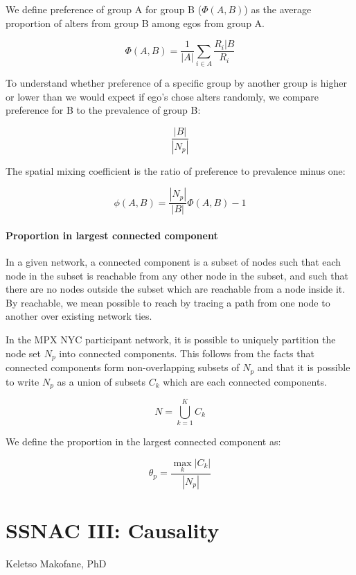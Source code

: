 \documentclass[
  letterpaper,
  DIV=11,
  numbers=noendperiod,
  oneside]{scrreprt}
\begin{document}
We define preference of group A for group B (\(\Phi(A,B)\)) as the
average proportion of alters from group B among egos from group A.

\[
\Phi(A,B) = \frac{1}{|A|}\sum_{i \in A}{\frac{ R_i | B}{R_i}}
\]

To understand whether preference of a specific group by another group is
higher or lower than we would expect if ego's chose alters randomly, we
compare preference for B to the prevalence of group B:

\[
 \frac{|B|}{|N_p|}
\]

The spatial mixing coefficient is the ratio of preference to prevalence
minus one:

\[
\phi(A,B) = \frac{|N_p|}{|B|} \Phi(A,B) - 1
\]

\hypertarget{proportion-in-largest-connected-component}{%
\subsubsection{Proportion in largest connected
component}\label{proportion-in-largest-connected-component}}

In a given network, a connected component is a subset of nodes such that
each node in the subset is reachable from any other node in the subset,
and such that there are no nodes outside the subset which are reachable
from a node inside it. By reachable, we mean possible to reach by
tracing a path from one node to another over existing network ties.

In the MPX NYC participant network, it is possible to uniquely partition
the node set \(N_p\) into connected components. This follows from the
facts that connected components form non-overlapping subsets of \(N_p\)
and that it is possible to write \(N_p\) as a union of subsets \(C_k\)
which are each connected components.

\[
N = \bigcup_{k = 1}^{K}{C_k}
\]

We define the proportion in the largest connected component as:

\[
\theta_p = \frac{\max_k{|C_k|}}{|N_p|}
\]

\hypertarget{sec-causal-interpretation}{%
\chapter{SSNAC III: Causality}\label{sec-causal-interpretation}}

\leavevmode{}%
Keletso Makofane, PhD
\end{document}
